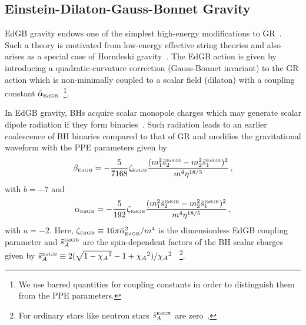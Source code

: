 \documentclass[prd,twocolumn,nofootinbib]{revtex4-1}
\newcommand{\EDGB}{{\mbox{\tiny EdGB}}}
\begin{document}
\subsection{Einstein-Dilaton-Gauss-Bonnet Gravity}\label{EdGB}
EdGB gravity endows one of the simplest high-energy modifications to GR~\cite{Moura:2006pz,Pani:2009wy}. Such a theory is motivated from low-energy effective string theories and also arises as a special case of Horndeski gravity~\cite{Zhang:2017unx,Berti:2015itd}. 
The EdGB action is given by introducing a quadratic-curvature correction (Gauss-Bonnet invariant) to the GR action which is non-minimally coupled to a scalar field (dilaton) with a coupling constant $\bar{\alpha}_\EDGB$~\cite{Kanti:1995vq}\footnote{We use barred quantities for coupling constants in order to distinguish them from the PPE parameters.}.

In EdGB gravity, BHs acquire scalar monopole charges which may generate scalar dipole radiation if they form binaries~\cite{Yagi:2011xp,Sotiriou:2014pfa,Berti:2018cxi,Prabhu:2018aun}. Such radiation leads to an earlier coalescence of BH binaries compared to that of GR and modifies the gravitational waveform with the PPE parameters given by~\cite{Yunes:2016jcc,Yagi:2011xp}
\begin{equation}
 \beta_\EDGB=-\frac{5}{7168}\zeta_\EDGB\frac{(m_1^2\tilde s_2^\EDGB-m_2^2\tilde s_1^\EDGB)^2}{m^4\eta^{18/5}}\,,
 \end{equation}
 with $b=-7$ and 
  \begin{equation}
 \alpha_\EDGB=-\frac{5}{192}\zeta_\EDGB\frac{(m_1^2 \tilde s_2^\EDGB-m_2^2 \tilde s_1^\EDGB)^2}{m^4\eta^{18/5}}\,,
 \end{equation}
 with $a=-2$.  Here, $\zeta_\EDGB\equiv 16 \pi \bar{\alpha}_\EDGB^2/m^4$ is the dimensionless EdGB coupling parameter and $\tilde s_{A}^\EDGB$ are the spin-dependent factors of the BH scalar charges given by $\tilde s_{A}^\EDGB\equiv 2(\sqrt{1-{\chi_A}^2}-1+{\chi_A}^2)/{\chi_A}^2~$~\cite{Berti:2018cxi,Prabhu:2018aun}\footnote{For ordinary stars like neutron stars $\tilde s_A^\EDGB$ are zero~\cite{Yagi:2011xp,Yagi:2015oca}.}.
\end{document}
